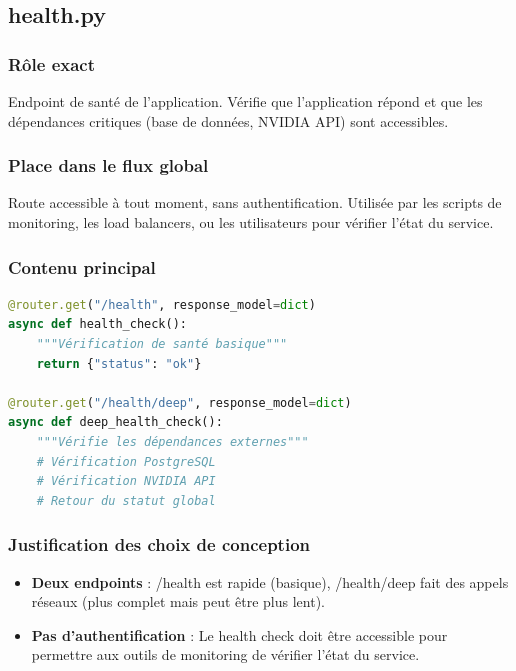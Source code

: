 \documentclass[12pt,a4paper,oneside]{book}
\begin{document}
\subsection{health.py}

\subsubsection{Rôle exact}

Endpoint de santé de l'application. Vérifie que l'application répond et que les dépendances critiques (base de données, NVIDIA API) sont accessibles.

\subsubsection{Place dans le flux global}

Route accessible à tout moment, sans authentification. Utilisée par les scripts de monitoring, les load balancers, ou les utilisateurs pour vérifier l'état du service.

\subsubsection{Contenu principal}

\begin{lstlisting}[language=Python]
@router.get("/health", response_model=dict)
async def health_check():
    """Vérification de santé basique"""
    return {"status": "ok"}

@router.get("/health/deep", response_model=dict)
async def deep_health_check():
    """Vérifie les dépendances externes"""
    # Vérification PostgreSQL
    # Vérification NVIDIA API
    # Retour du statut global
\end{lstlisting}

\subsubsection{Justification des choix de conception}

\begin{itemize}
    \item \textbf{Deux endpoints} : /health est rapide (basique), /health/deep fait des appels réseaux (plus complet mais peut être plus lent).
    
    \item \textbf{Pas d'authentification} : Le health check doit être accessible pour permettre aux outils de monitoring de vérifier l'état du service.
\end{itemize}
\end{document}
